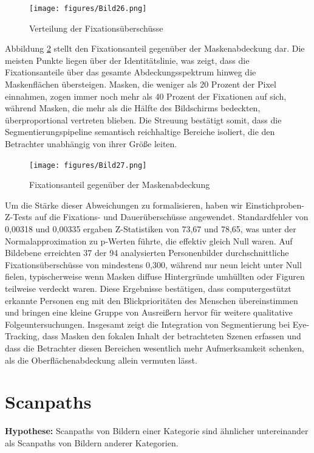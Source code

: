 \documentclass[
    language=german, %
    thesis=seminar, %
    supervisor=postdoc, %
    multiauthor=true, %
    ]{settings/csssa-thesis}
\begin{document}
\begin{figure}[h]
    \centering
    \texttt{[image: figures/Bild26.png]}
    \caption{Verteilung der Fixationsüberschüsse }\label{fig:bild21}
\end{figure}

Abbildung \ref{fig:bild22} stellt den Fixationsanteil gegenüber der Maskenabdeckung dar. Die meisten Punkte liegen über der Identitätslinie, 
was zeigt, dass die Fixationsanteile über das gesamte Abdeckungsspektrum hinweg die Maskenflächen übersteigen. Masken, 
die weniger als 20 Prozent der Pixel einnahmen, zogen immer noch mehr als 40 Prozent der Fixationen auf sich, während Masken, 
die mehr als die Hälfte des Bildschirms bedeckten, überproportional vertreten blieben. Die Streuung bestätigt somit, 
dass die Segmentierungspipeline semantisch reichhaltige Bereiche isoliert, die den Betrachter unabhängig von ihrer Grö{\ss}e leiten.

\begin{figure}[h]
    \centering
    \texttt{[image: figures/Bild27.png]}
    \caption{Fixationsanteil gegenüber der Maskenabdeckung}\label{fig:bild22}
\end{figure}

Um die Stärke dieser Abweichungen zu formalisieren, haben wir Einstichproben-Z-Tests auf die Fixations- 
und Dauerüberschüsse angewendet. Standardfehler von 0,00318 und 0,00335 ergaben Z-Statistiken von 
73,67 und 78,65, was unter der Normalapproximation zu p-Werten führte, die effektiv gleich Null waren. 
Auf Bildebene erreichten 37 der 94 analysierten Personenbilder durchschnittliche Fixationsüberschüsse von 
mindestens 0,300, während nur neun leicht unter Null fielen, typischerweise wenn Masken diffuse Hintergründe 
umhüllten oder Figuren teilweise verdeckt waren. Diese Ergebnisse bestätigen, dass computergestützt 
erkannte Personen eng mit den Blickprioritäten des Menschen übereinstimmen und bringen eine kleine 
Gruppe von Ausrei{\ss}ern hervor für weitere qualitative Folgeuntersuchungen. Insgesamt zeigt die 
Integration von Segmentierung bei Eye-Tracking, dass Masken den fokalen Inhalt der betrachteten 
Szenen erfassen und dass die Betrachter diesen Bereichen wesentlich mehr Aufmerksamkeit schenken, als die 
Oberflächenabdeckung allein vermuten lässt.

\section{Scanpaths}
 
\textbf{Hypothese:} Scanpaths von Bildern einer Kategorie sind ähnlicher untereinander als Scanpaths von Bildern anderer Kategorien.
\end{document}
